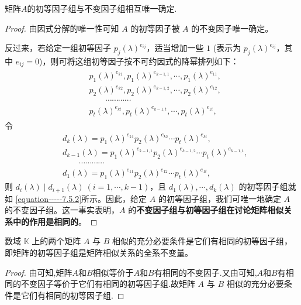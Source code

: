 \documentclass[../../main.tex]{subfiles}
\begin{document}
\begin{proposition}\label{proposition:初等因子组与不变因子组相互唯一确定}
矩阵$A$的初等因子组与不变因子组相互唯一确定.
\end{proposition}
\begin{proof}
由因式分解的唯一性可知 $A$ 的初等因子被 $A$ 的不变因子唯一确定。

反过来，若给定一组初等因子 $p_j(\lambda)^{e_{ij}}$，适当增加一些 $1$ (表示为 $p_j(\lambda)^{e_{ij}}$，其中 $e_{ij}=0$)，则可将这组初等因子按不可约因式的降幂排列如下：
\begin{align}\label{equation-----7.5.2}
\begin{aligned}
&p_1(\lambda)^{e_{k1}},p_1(\lambda)^{e_{k - 1,1}},\cdots,p_1(\lambda)^{e_{11}},\\
&p_2(\lambda)^{e_{k2}},p_2(\lambda)^{e_{k - 1,2}},\cdots,p_2(\lambda)^{e_{12}},\\
&\quad \quad \cdots\cdots\cdots\cdots\\
&p_t(\lambda)^{e_{kt}},p_t(\lambda)^{e_{k - 1,t}},\cdots,p_t(\lambda)^{e_{1t}},
\end{aligned}
\end{align}
令
\begin{align*}
&d_k(\lambda)=p_1(\lambda)^{e_{k1}}p_2(\lambda)^{e_{k2}}\cdots p_t(\lambda)^{e_{kt}},\\
&d_{k - 1}(\lambda)=p_1(\lambda)^{e_{k - 1,1}}p_2(\lambda)^{e_{k - 1,2}}\cdots p_t(\lambda)^{e_{k - 1,t}},\\
&\quad \quad \cdots\cdots\cdots\cdots\\
&d_1(\lambda)=p_1(\lambda)^{e_{11}}p_2(\lambda)^{e_{12}}\cdots p_t(\lambda)^{e_{1t}},
\end{align*}
则 $d_i(\lambda)\mid d_{i + 1}(\lambda)\ (i = 1,\cdots,k - 1)$，且 $d_1(\lambda),\cdots,d_k(\lambda)$ 的初等因子组就如 \eqref{equation-----7.5.2}所示。因此，给定 $A$ 的初等因子组，我们可唯一地确定 $A$ 的不变因子组。这一事实表明，$A$ 的\textbf{不变因子组与初等因子组在讨论矩阵相似关系中的作用是相同的}。 
\end{proof}


\begin{theorem}\label{theorem:矩阵相似的充分必要条件是它们有相同的初等因子组}
数域 $\mathbb{K}$ 上的两个矩阵 $A$ 与 $B$ 相似的充分必要条件是它们有相同的初等因子组，即矩阵的初等因子组是矩阵相似关系的全系不变量。 
\end{theorem}
\begin{proof}
由可知,矩阵$A$和$B$相似等价于$A$和$B$有相同的不变因子.又由可知,$A$和$B$有相同的不变因子等价于它们有相同的初等因子组.故矩阵 $A$ 与 $B$ 相似的充分必要条件是它们有相同的初等因子组.
\end{proof}
\end{document}
